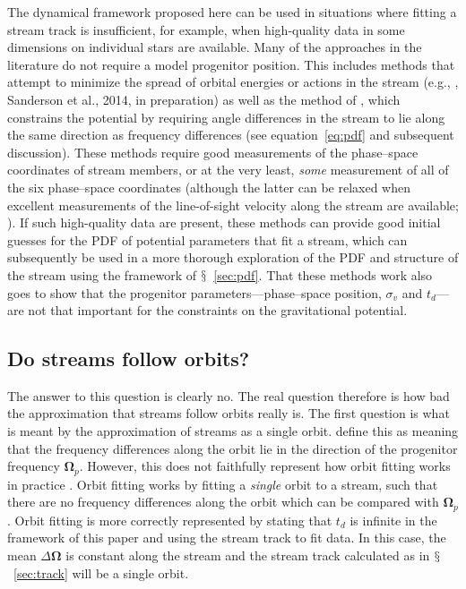 \documentclass{emulateapj}
\newcommand{\etal}{et al.}
\newcommand{\eg}{e.g.}
\newcommand{\eqnname}{equation}
\newcommand{\equationname}{\eqnname}
\newcommand{\sectionname}{$\mathsection$}
\renewcommand{\vec}[1]{\ensuremath{\mathbf{#1}}}
\newcommand{\veco}{\ensuremath{\vec{\Omega}}}
\newcommand{\sigv}{\ensuremath{\sigma_v}}
\begin{document}
The dynamical framework proposed here can be used in situations where
fitting a stream track is insufficient, for example, when high-quality
data in some dimensions on individual stars are available. Many of the
approaches in the literature do not require a model progenitor
position. This includes methods that attempt to minimize the spread of
orbital energies or actions in the stream (\eg,
\citealt{Binney08a,Penarrubia12a}, Sanderson \etal, 2014, in
preparation) as well as the method of \citet{Sanders13b}, which
constrains the potential by requiring angle differences in the stream
to lie along the same direction as frequency differences (see
\equationname~\ref{eq:pdf} and subsequent discussion). These methods
require good measurements of the phase--space coordinates of stream
members, or at the very least, \emph{some} measurement of all of the
six phase--space coordinates (although the latter can be relaxed when
excellent measurements of the line-of-sight velocity along the stream
are available; \citealt{Binney08a}). If such high-quality data are
present, these methods can provide good initial guesses for the PDF of
potential parameters that fit a stream, which can subsequently be used
in a more thorough exploration of the PDF and structure of the stream
using the framework of \sectionname~\ref{sec:pdf}. That these methods
work also goes to show that the progenitor parameters---phase--space
position, $\sigv$ and $t_d$---are not that important for the
constraints on the gravitational potential.

\subsection{Do streams follow orbits?}\label{sec:discussorbit}

The answer to this question is clearly no. The real question therefore
is how bad the approximation that streams follow orbits really is. The
first question is what is meant by the approximation of streams as a
single orbit. \citet{Sanders13a} define this as meaning that the
frequency differences along the orbit lie in the direction of the
progenitor frequency $\veco_p$. However, this does not faithfully
represent how orbit fitting works in practice
\citep[\eg,][]{Koposov10a}. Orbit fitting works by fitting a
\emph{single} orbit to a stream, such that there are no frequency
differences along the orbit which can be compared with
$\veco_p$. Orbit fitting is more correctly represented by stating that
$t_d$ is infinite in the framework of this paper and using the stream
track to fit data. In this case, the mean $\Delta \veco$ is constant
along the stream and the stream track calculated as in
\sectionname~\ref{sec:track} will be a single orbit.
\end{document}
